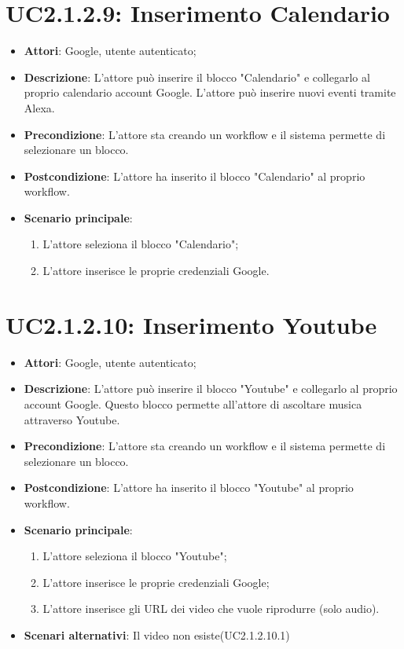 \section{UC2.1.2.9: Inserimento Calendario}
\label{UC2.1.2.9}
\begin{itemize}
	\item \textbf{Attori}: Google, utente autenticato;
	\item \textbf{Descrizione}: L'attore può inserire il blocco "Calendario" e collegarlo al proprio calendario account Google. L'attore può inserire nuovi eventi tramite Alexa.
	\item \textbf{Precondizione}: L'attore sta creando un workflow e il sistema permette di selezionare un blocco.
	\item \textbf{Postcondizione}: L'attore ha inserito il blocco "Calendario" al proprio workflow.
	\item \textbf{Scenario principale}:
	\begin{enumerate} \item L'attore seleziona il blocco "Calendario";  \item  L'attore inserisce le proprie credenziali Google.\end{enumerate}
\end{itemize}

\section{UC2.1.2.10: Inserimento Youtube}
\label{UC2.1.2.10}
\begin{itemize}
	\item \textbf{Attori}: Google, utente autenticato;
	\item \textbf{Descrizione}: L'attore può inserire il blocco "Youtube" e collegarlo al proprio account Google. Questo blocco permette all'attore di ascoltare musica attraverso Youtube.
	\item \textbf{Precondizione}: L'attore sta creando un workflow e il sistema permette di selezionare un blocco.
	\item \textbf{Postcondizione}: L'attore ha inserito il blocco "Youtube" al proprio workflow.
	\item \textbf{Scenario principale}:
	\begin{enumerate} \item L'attore seleziona il blocco "Youtube"; \item L'attore inserisce le proprie credenziali Google; \item  L'attore inserisce gli URL dei video che vuole riprodurre (solo audio).\end{enumerate}
	\item \textbf{Scenari alternativi}:
	Il video non esiste(UC2.1.2.10.1)
\end{itemize}

